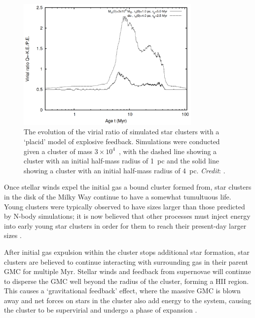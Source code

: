 \begin{figure}[tb]
	\centering
	\includegraphics[width=0.8\textwidth]{fig/c1/virialisation_placid_gas_expulsion.png}
	\caption[The evolution of the virial ratio of simulated star clusters with a `placid' model of explosive feedback]{The evolution of the virial ratio of simulated star clusters with a `placid' model of explosive feedback. Simulations were conducted given a cluster of mass  $3\times10^4$~\MSun, with the dashed line showing a cluster with an initial half-mass radius of 1~pc and the solid line showing a cluster with an initial half-mass radius of 4~pc. \emph{Credit}: \cite{banerjee_how_2017}.}
	\label{fig:intro:theory:feedback}
\end{figure}

Once stellar winds expel the initial gas a bound cluster formed from, star clusters in the disk of the Milky Way continue to have a somewhat tumultuous life. Young clusters were typically observed to have sizes larger than those predicted by N-body simulations; it is now believed that other processes must inject energy into early young star clusters in order for them to reach their present-day larger sizes \citep{banerjee_how_2017}.

After initial gas expulsion within the cluster stops additional star formation, star clusters are believed to continue interacting with surrounding gas in their parent GMC for multiple Myr. Stellar winds and feedback from supernovae will continue to disperse the GMC well beyond the radius of the cluster, forming a HII region. This causes a `gravitational feedback' effect, where the massive GMC is blown away and net forces on stars in the cluster also add energy to the system, causing the cluster to be supervirial and undergo a phase of expansion \citep{krause_physics_2020}.

